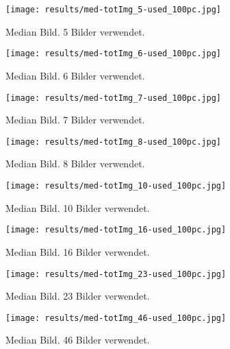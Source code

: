 \documentclass{paper}
\begin{document}
		
			\begin{figure}
				\texttt{[image: results/med-totImg\_5-used\_100pc.jpg]}
				\caption{Median Bild. 5 Bilder verwendet.}
				\texttt{[image: results/med-totImg\_6-used\_100pc.jpg]}
				\caption{Median Bild. 6 Bilder verwendet.}
				\texttt{[image: results/med-totImg\_7-used\_100pc.jpg]}
				\caption{Median Bild. 7 Bilder verwendet.}
				\label{res1}
			\end{figure}
			\begin{figure}
				\texttt{[image: results/med-totImg\_8-used\_100pc.jpg]}
				\caption{Median Bild. 8 Bilder verwendet.}
				\texttt{[image: results/med-totImg\_10-used\_100pc.jpg]}
				\caption{Median Bild. 10 Bilder verwendet.}
				\texttt{[image: results/med-totImg\_16-used\_100pc.jpg]}
				\caption{Median Bild. 16 Bilder verwendet.}
				\label{res2}
			\end{figure}
			\begin{figure}
				\texttt{[image: results/med-totImg\_23-used\_100pc.jpg]}
				\caption{Median Bild. 23 Bilder verwendet.}
				\texttt{[image: results/med-totImg\_46-used\_100pc.jpg]}
				\caption{Median Bild. 46 Bilder verwendet.}	
				\label{res3}			
			\end{figure}
\end{document}
